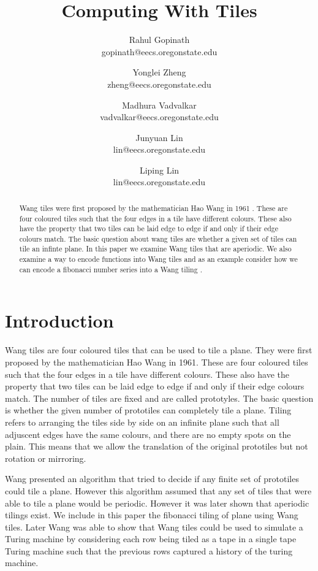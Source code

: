 \documentclass{article}
\begin{document}
\title{Computing With Tiles}
\author{
Rahul Gopinath\\
gopinath@eecs.oregonstate.edu
\and
Yonglei Zheng\\
zheng@eecs.oregonstate.edu
\and
Madhura Vadvalkar\\
vadvalkar@eecs.oregonstate.edu
\and
Junyuan Lin\\
lin@eecs.oregonstate.edu
\and
Liping Lin\\
lin@eecs.oregonstate.edu
}

\maketitle

\begin{abstract}
Wang tiles were first proposed by the mathematician Hao Wang in 1961 \cite{wang}. These are four coloured tiles such that the four edges in a tile have different colours. These also have the property that two tiles can be laid edge to edge if and only if their edge colours match. The basic question about wang tiles are whether a given set of tiles can tile an infinte plane. In this paper we examine Wang tiles that are aperiodic\cite{undecide}. We also examine a way to encode functions into Wang tiles and as an example consider how we can encode a fibonacci number series into a Wang tiling \cite{tilings}.
\end{abstract}

\section*{Introduction}
Wang tiles are four coloured tiles that can be used to tile a plane.  They were first proposed by the mathematician Hao Wang in 1961. These are four coloured tiles such that the four edges in a tile have different colours. These also have the property that two tiles can be laid edge to edge if and only if their edge colours match. The number of tiles are fixed and are called prototyles. The basic question is whether the given number of prototiles can completely tile a plane. Tiling refers to arranging the tiles side by side on an infinite plane such that all adjuscent edges have the same colours, and there are no empty spots on the plain. This means that we allow the translation of the original prototiles but not rotation or mirroring.

Wang presented an algorithm that tried to decide if any finite set of prototiles could tile a plane. However this algorithm assumed that any set of tiles that were able to tile a plane would be periodic. However it was later shown that aperiodic tilings exist. We include in this paper the fibonacci tiling of plane using Wang tiles. Later Wang was able to show that Wang tiles could be used to simulate a Turing machine by considering each row being tiled as a tape in a single tape Turing machine such that the previous rows captured a history of the turing machine.
\end{document}
